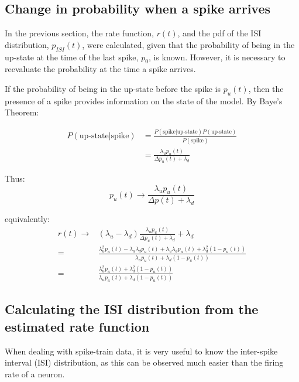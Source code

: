 \documentclass[11pt]{paper}
\begin{document}
\subsection{Change in probability when a spike arrives}

In the previous section, the rate function, $r(t)$, and the pdf of the ISI distribution, $p_{ISI}(t)$, were calculated, given that the probability of being in the up-state at the time of the last spike, $p_0$, is known.  However, it is necessary to reevaluate the probability at the time a spike arrives.

If the probability of being in the up-state before the spike is $p_u(t)$, then the presence of a spike provides information on the state of the model. By Baye's Theorem:

\begin{equation}
\begin{split}
P(\mbox{up-state} | \mbox{spike}) &= \frac{P(\mbox{spike}|\mbox{up-state})P(\mbox{up-state})}{P(\mbox{spike})} \\
&=\frac{\lambda_u p_u(t)}{\Delta p_u(t) + \lambda_d }
\end{split}
\end{equation}

Thus:
\begin{equation}
p_u(t) \rightarrow \frac{\lambda_u p_u(t)}{\Delta p(t) + \lambda_d}
\end{equation}

equivalently:
\begin{equation}
\begin{split}
r(t) \rightarrow &(\lambda_u - \lambda_d)\frac{\lambda_u p_u(t)}{\Delta p_u(t)+ \lambda_d} + \lambda_d\\
= &\frac{\lambda_u^2 p_u(t) - \lambda_u\lambda_dp_u(t)+\lambda_u\lambda_dp_u(t) + \lambda_d^2(1-p_u(t))}{\lambda_u p_u(t) + \lambda_d(1- p_u(t))}\\
= & \frac{\lambda_u^2 p_u(t) + \lambda_d^2(1-p_u(t))}{\lambda_up_u(t) + \lambda_d(1-p_u(t))}
\end{split}
\end{equation}

\subsection{Calculating the ISI distribution from the estimated rate function}
When dealing with spike-train data, it is very useful to know the inter-spike interval (ISI) distribution, as this can be observed much easier than the firing rate of a neuron.
\end{document}
